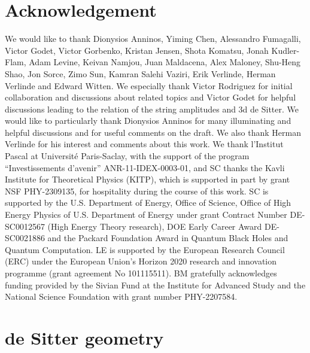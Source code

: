 \documentclass[12pt,a4paper]{article}
\begin{document}
\section*{Acknowledgement}
We would like to thank Dionysios Anninos, Yiming Chen, Alessandro Fumagalli, Victor Godet, Victor Gorbenko, Kristan Jensen, Shota Komatsu, Jonah Kudler-Flam, Adam Levine, Keivan Namjou, Juan Maldacena, Alex Maloney,  Shu-Heng Shao, Jon Sorce, Zimo Sun, Kamran Salehi Vaziri, Erik Verlinde, Herman Verlinde and Edward Witten.
We especially thank Victor Rodriguez for initial collaboration and discussions about related topics and Victor Godet for helpful discussions leading to the relation of the string amplitudes and 3d de Sitter. We would like to particularly thank Dionysios Anninos for many illuminating and helpful discussions and for useful comments on the draft. We also thank Herman Verlinde for his interest and comments about this work.
We thank l’Institut Pascal
at Universit\'e Paris-Saclay, with the
support of the program ``Investissements d’avenir'' ANR-11-IDEX-0003-01, 
and SC thanks the Kavli Institute for Theoretical Physics (KITP), which is supported in part by grant NSF PHY-2309135, for hospitality during the course of this work.  
SC is supported by the U.S. Department of Energy, Office of Science, Office of High Energy Physics of U.S. Department of Energy under grant Contract Number DE-SC0012567 (High Energy Theory research), DOE Early Career Award  DE-SC0021886 and the Packard Foundation Award in Quantum Black Holes and Quantum Computation. LE is supported by the European Research Council (ERC) under the European Union’s Horizon 2020 research
and innovation programme (grant agreement No 101115511).
BM gratefully acknowledges funding provided by the Sivian Fund at the Institute for Advanced Study and the National Science Foundation with grant number PHY-2207584.




\appendix

\section{de Sitter geometry}\label{app:dS}
\end{document}
